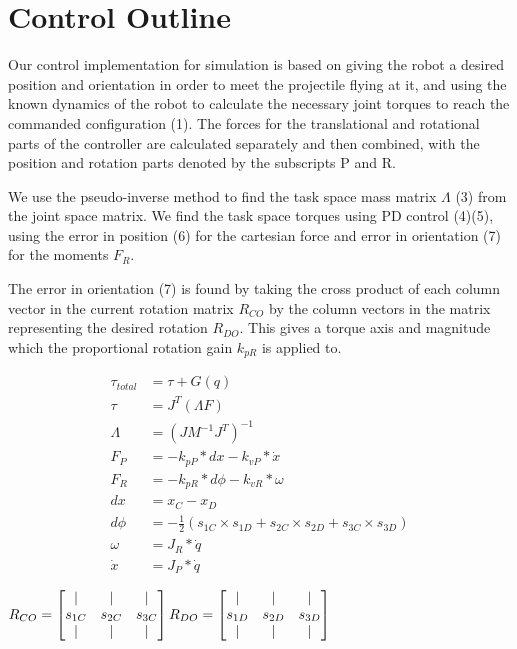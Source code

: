 \documentclass[10pt,a4paper,notitlepage]{report}
\begin{document}
\section*{Control Outline}

Our control implementation for simulation is based on giving the robot a desired position
and orientation in order to meet the projectile flying at it, and using the known dynamics of the robot to calculate the necessary joint torques to reach the commanded configuration (1). The forces for the translational and rotational parts of the controller
are calculated separately and then combined, with the position and rotation parts denoted
by the subscripts P and R. 

We use the pseudo-inverse method to 
find the task space mass matrix $\Lambda$ (3)
from the joint space matrix. We find the task space torques using PD control (4)(5), 
using the error in position (6) for the cartesian force and error in orientation (7) 
for the moments $F_{R}$. 

The error in orientation (7) is found by taking the cross product of each column vector in the 
current rotation matrix $R_{CO}$ by the column vectors in the matrix 
representing the desired rotation $R_{DO}$. This gives a torque axis and magnitude which the proportional rotation gain $k_{pR}$ is applied to.

     

\begin{align}
\tau_{total} &= \tau +G(q)\\
\tau &= J^{T}(\Lambda F)\\
\Lambda &= (JM^{-1}J^{T})^{-1}\\F_{P} &= -k_{pP}*dx - k_{vP}*\dot{x}\\
F_{R} &= -k_{pR}*d\phi - k_{vR}*\omega\\
dx &= x_{C} - x_{D}\\
d\phi &= -\frac{1}{2}(s_{1C}\times s_{1D}+s_{2C}\times s_{2D}+s_{3C}\times s_{3D})\\
\omega &= J_{R}*\dot{q}\\
\dot{x} &= J_{P}*\dot{q}
\end{align}

$R_{CO} = 
\begin{bmatrix}
\vert & \vert & \vert\\
s_{1C} & s_{2C} & s_{3C}\\
\vert & \vert & \vert\\
\end{bmatrix}\\
R_{DO} = 
\begin{bmatrix}
\vert & \vert & \vert\\
s_{1D} & s_{2D} & s_{3D}\\
\vert & \vert & \vert\\
\end{bmatrix}
$
\end{document}
